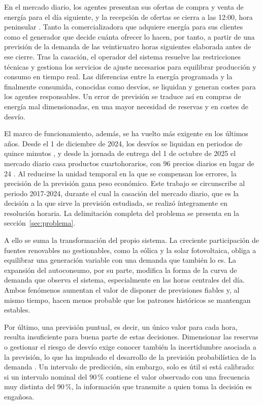En el mercado diario, los agentes presentan sus ofertas de compra y venta de
energía para el día siguiente, y la recepción de ofertas se cierra a las
12:00, hora peninsular \parencite{omie2025mtu15}. Tanto la comercializadora que adquiere
energía para sus clientes como el generador que decide cuánta ofrecer lo hacen,
por tanto, a partir de una previsión de la demanda de las veinticuatro horas
siguientes elaborada antes de ese cierre. Tras la casación, el operador del
sistema resuelve las restricciones técnicas y gestiona los servicios de ajuste
necesarios para equilibrar producción y consumo en tiempo real. Las diferencias
entre la energía programada y la finalmente consumida, conocidas como desvíos,
se liquidan y generan costes para los agentes responsables. Un error de
previsión se traduce así en compras de energía mal dimensionadas, en una mayor
necesidad de reservas y en costes de desvío.

El marco de funcionamiento, además, se ha vuelto más exigente en los últimos
años. Desde el 1 de diciembre de 2024, los desvíos se liquidan en periodos de
quince minutos \parencite{cnmc2025procedimientos}, y desde la jornada de entrega
del 1 de octubre de 2025 el mercado diario casa productos cuartohorarios, con
96 precios diarios en lugar de 24 \parencite{omie2025mtu15}. Al reducirse la
unidad temporal en la que se compensan los errores, la precisión de la
previsión gana peso económico. Este trabajo se circunscribe al periodo
2017-2024, durante el cual la casación del mercado diario, que es la decisión
a la que sirve la previsión estudiada, se realizó íntegramente en resolución
horaria. La delimitación completa del problema se presenta en la
sección~\ref{sec:problema}.

A ello se suma la transformación del propio sistema. La creciente participación
de fuentes renovables no gestionables, como la eólica y la solar fotovoltaica,
obliga a equilibrar una generación variable con una demanda que también lo es.
La expansión del autoconsumo, por su parte, modifica la forma de la curva de
demanda que observa el sistema, especialmente en las horas centrales del día.
Ambos fenómenos aumentan el valor de disponer de previsiones fiables y, al mismo
tiempo, hacen menos probable que los patrones históricos se mantengan estables.

Por último, una previsión puntual, es decir, un único valor para cada hora,
resulta insuficiente para buena parte de estas decisiones. Dimensionar las
reservas o gestionar el riesgo de desvío exige conocer también la incertidumbre
asociada a la previsión, lo que ha impulsado el desarrollo de la previsión
probabilística de la demanda \parencite{hong2016probabilistic}. Un intervalo de
predicción, sin embargo, solo es útil si está calibrado: si un intervalo
nominal del 90\,\% contiene el valor observado con una frecuencia muy distinta
del 90\,\%, la información que transmite a quien toma la decisión es engañosa.

